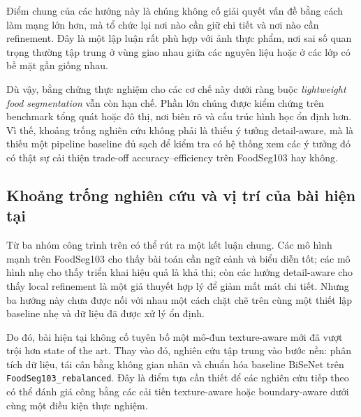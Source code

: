 Điểm chung của các hướng này là chúng không cố giải quyết vấn đề bằng cách làm mạng lớn hơn, mà tổ chức lại nơi nào cần giữ chi tiết và nơi nào cần refinement. Đây là một lập luận rất phù hợp với ảnh thực phẩm, nơi sai số quan trọng thường tập trung ở vùng giao nhau giữa các nguyên liệu hoặc ở các lớp có bề mặt gần giống nhau.

Dù vậy, bằng chứng thực nghiệm cho các cơ chế này dưới ràng buộc \emph{lightweight food segmentation} vẫn còn hạn chế. Phần lớn chúng được kiểm chứng trên benchmark tổng quát hoặc đô thị, nơi biên rõ và cấu trúc hình học ổn định hơn. Vì thế, khoảng trống nghiên cứu không phải là thiếu ý tưởng detail-aware, mà là thiếu một pipeline baseline đủ sạch để kiểm tra có hệ thống xem các ý tưởng đó có thật sự cải thiện trade-off accuracy--efficiency trên FoodSeg103 hay không.

\subsection{Khoảng trống nghiên cứu và vị trí của bài hiện tại}

Từ ba nhóm công trình trên có thể rút ra một kết luận chung. Các mô hình mạnh trên FoodSeg103 cho thấy bài toán cần ngữ cảnh và biểu diễn tốt; các mô hình nhẹ cho thấy triển khai hiệu quả là khả thi; còn các hướng detail-aware cho thấy local refinement là một giả thuyết hợp lý để giảm mất mát chi tiết. Nhưng ba hướng này chưa được nối với nhau một cách chặt chẽ trên cùng một thiết lập baseline nhẹ và dữ liệu đã được xử lý ổn định.

Do đó, bài hiện tại không cố tuyên bố một mô-đun texture-aware mới đã vượt trội hơn state of the art. Thay vào đó, nghiên cứu tập trung vào bước nền: phân tích dữ liệu, tái cân bằng không gian nhãn và chuẩn hóa baseline BiSeNet trên \texttt{FoodSeg103\_rebalanced}. Đây là điểm tựa cần thiết để các nghiên cứu tiếp theo có thể đánh giá công bằng các cải tiến texture-aware hoặc boundary-aware dưới cùng một điều kiện thực nghiệm.
